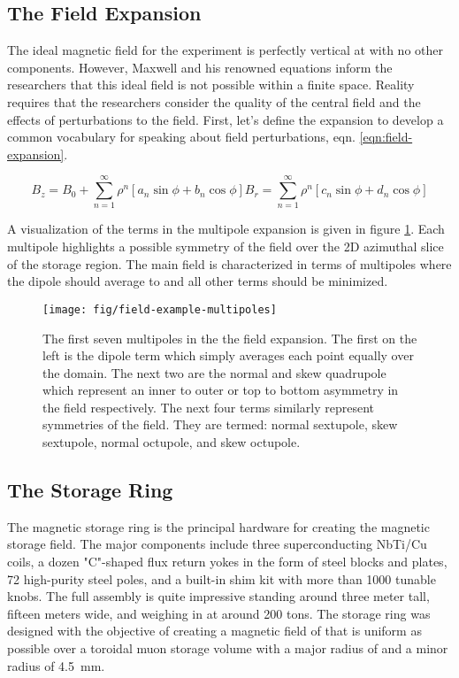 \subsection{The Field Expansion}

The ideal magnetic field for the experiment is perfectly vertical at \bmagic with no other components.  However, Maxwell and his renowned equations inform the researchers that this ideal field is not possible within a finite space.  Reality requires that the researchers consider the quality of the central field and the effects of perturbations to the field.  First, let's define the expansion to develop a common vocabulary for speaking about field perturbations, eqn. \ref{eqn:field-expansion}.

\begin{equation}
B_z = B_0 + \sum_{n=1}^{\infty} \rho^n[a_n \sin{\phi} + b_n \cos{\phi}]
B_r = \sum_{n=1}^{\infty} \rho^n[c_n \sin{\phi} + d_n \cos{\phi}]
\label{eqn:field-expansion}
\end{equation}

\noindent
A visualization of the terms in the multipole expansion is given in figure \ref{fig:field-example-multipoles}.  Each multipole highlights a possible symmetry of the field over the 2D azimuthal slice of the storage region. The main field is characterized in terms of multipoles where the dipole should average to \bmagic and all other terms should be minimized.

\begin{figure}
\label{fig:field-example-multipoles}
\texttt{[image: fig/field-example-multipoles]}
\caption{The first seven multipoles in the the field expansion.  The first on the left is the dipole term which simply averages each point equally over the domain.  The next two are the normal and skew quadrupole which represent an inner to outer or top to bottom asymmetry in the field respectively.  The next four terms similarly represent symmetries of the field.  They are termed: normal sextupole, skew sextupole, normal octupole, and skew octupole.}
\end{figure}

\subsection{The Storage Ring}

The magnetic storage ring is the principal hardware for creating the magnetic storage field.  The major components include three superconducting NbTi/Cu coils, a dozen "C"-shaped flux return yokes in the form of steel blocks and plates, 72 high-purity steel poles, and a built-in shim kit with more than 1000 tunable knobs.  The full assembly is quite impressive standing around three meter tall, fifteen meters wide, and weighing in at around 200 tons.  The storage ring was designed with the objective of creating a magnetic field of \bmagic that is uniform as possible over a toroidal muon storage volume with a major radius of \rmagic and a minor radius of \SI{4.5}{\mm}.

